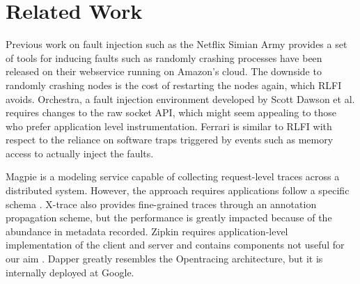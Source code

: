 

\section{Related Work}
Previous work on fault injection such as the Netflix Simian Army\cite{netflix:chaosmonkey} provides a set of tools for inducing faults such as randomly crashing processes have been released on their webservice running on Amazon's cloud. The downside to randomly crashing nodes is the cost of restarting the nodes again, which RLFI avoids. Orchestra\cite{orchestra}, a fault injection environment developed by Scott Dawson et al.  requires changes to the raw socket API, which might seem appealing to those who prefer application level instrumentation. Ferrari\cite{ferrari} is similar to RLFI with respect to the reliance on software traps triggered by events such as memory access to actually inject the faults. 

Magpie\cite{magpie} is a modeling service capable of collecting request-level traces across a distributed system. However, the approach requires applications follow a specific schema . X-trace\cite{xtrace} also provides fine-grained traces through an annotation propagation scheme, but the performance is greatly impacted because of the abundance in metadata recorded. Zipkin\cite{zipkin} requires application-level implementation of the client and server and contains components not useful for our aim . Dapper\cite{sigelman:dapper} greatly resembles the Opentracing architecture, but it is internally deployed at Google. 


